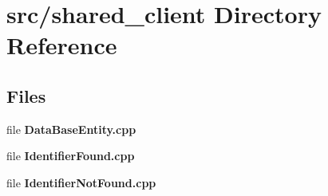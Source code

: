 \section{src/shared\+\_\+client Directory Reference}
\label{dir_79727b49989ab7634de1e90dbedf0f74}
\subsection*{Files}
\begin{DoxyCompactItemize}
\item 
file {\bf Data\+Base\+Entity.\+cpp}
\item 
file {\bf Identifier\+Found.\+cpp}
\item 
file {\bf Identifier\+Not\+Found.\+cpp}
\end{DoxyCompactItemize}
